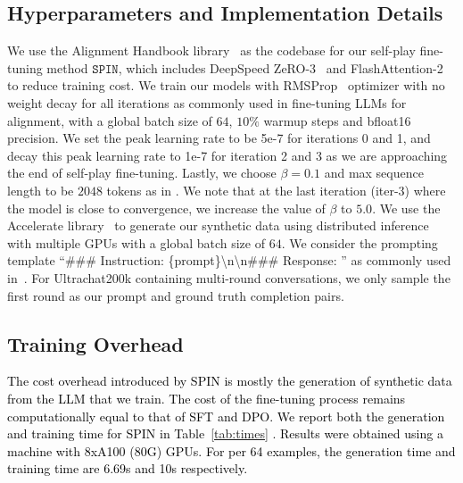 \documentclass{article}
\newcommand{\method}{\texttt{SPIN}}
\def\CC{\textcolor{black}}
\begin{document}
\subsection{Hyperparameters and Implementation Details}
\begin{table}[ht]
    \centering
    \caption{Detailed information of HuggingFace Open LLM Leaderboard. For each evaluation dataset, we present the number of few-shot examples and metric adopted for evaluation.}
    \label{tab:open-llm-info}
\end{table}
We use the Alignment Handbook library~\citep{alignment_handbook2023} as the codebase for our self-play fine-tuning method $\method$, which includes DeepSpeed ZeRO-3~\citep{rajbhandari2020zero} and FlashAttention-2~\citep{dao2023flashattention} to reduce training cost. We train our models with RMSProp~\citep{hinton2012neural} optimizer with no weight decay for all iterations as commonly used in fine-tuning LLMs for alignment, with a global batch size of $64$, $10\%$ warmup steps and bfloat16 precision.  
We set the peak learning rate to be 5e-7 for iterations 0 and 1, and decay this peak learning rate to 1e-7 for iteration 2 and 3 as we are approaching the end of self-play fine-tuning. Lastly, we choose $\beta=0.1$ and max sequence length to be $2048$ tokens as in \citet{alignment_handbook2023}. We note that at the last iteration (iter-3) where the  model is close to convergence, we increase the value of $\beta$ to $5.0$. 
We use the Accelerate library~\citep{accelerate} to generate our synthetic data using distributed inference with multiple GPUs with a global batch size of $64$. We consider the prompting template ``\#\#\# Instruction: \{prompt\}\textbackslash n\textbackslash n\#\#\# Response: '' as commonly used in~\citet{alpaca}. For Ultrachat200k containing multi-round conversations, we only sample the first round as our prompt and ground truth completion pairs.  


\subsection{Training Overhead}
\CC{The cost overhead introduced by SPIN is mostly the generation of synthetic data from the LLM that we train. The cost of the fine-tuning process remains computationally equal to that of SFT and DPO. We report both the generation and training time for SPIN in Table~\ref{tab:times} . Results were obtained using a machine with 8xA100 (80G) GPUs. For per 64 examples, the generation time and training time are 6.69s and 10s respectively.}
\end{document}
